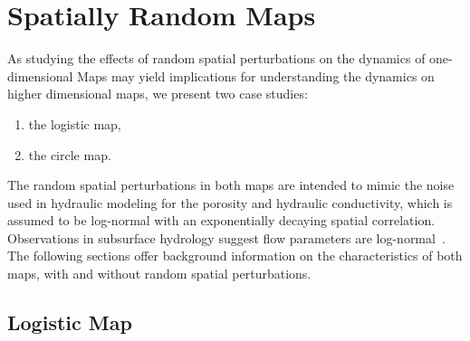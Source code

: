 \chapter{Spatially Random Maps}
\label{background}
As studying the effects of random spatial perturbations
on the dynamics of one-dimensional Maps may yield implications for
understanding the dynamics on higher dimensional maps, we present two
case studies:
\begin{enumerate}
\item the logistic map,
\item the circle map.
\end{enumerate}
The random spatial perturbations in both maps are intended to mimic
the noise used in hydraulic modeling for the porosity and hydraulic
conductivity, which is assumed to be log-normal with an
exponentially decaying spatial correlation. Observations
in subsurface hydrology suggest flow parameters are log-normal~\cite{gelhar}. The following sections
offer background information on the characteristics of both maps, with
and without random spatial perturbations. 
\section{Logistic Map}

